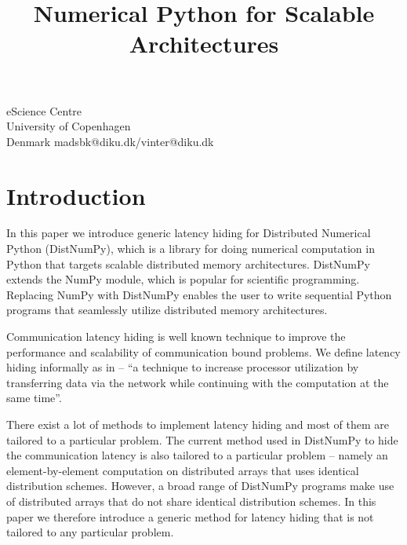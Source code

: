 \documentclass[preprint]{../PGAS10/sigplanconf}
\begin{document}


\title{Numerical Python for Scalable Architectures}

           {eScience Centre\\ University of Copenhagen\\ Denmark}
           {madsbk@diku.dk/vinter@diku.dk}

\maketitle

\begin{abstract}

\end{abstract}

\section{Introduction}
In this paper we introduce generic latency hiding for Distributed Numerical Python (DistNumPy)\cite{distnumpy09}, which is a library for doing numerical computation in Python that targets scalable distributed memory architectures. DistNumPy extends the NumPy module\cite{numpy}, which is popular for scientific programming. Replacing NumPy with DistNumPy enables the user to write sequential Python programs that seamlessly utilize distributed memory architectures.

Communication latency hiding is well known technique to improve the performance and scalability of communication bound problems. We define latency hiding informally as in \cite{Strumpen94latencyhiding} -- ``a technique to increase processor utilization by transferring data via the network while continuing with the computation at the same time''.

There exist a lot of methods to implement latency hiding and most of them are tailored to a particular problem. The current method used in DistNumPy to hide the communication latency is also tailored to a particular problem -- namely an element-by-element computation on distributed arrays that uses identical distribution schemes. However, a broad range of DistNumPy programs make use of distributed arrays that do not share identical distribution schemes. In this paper we therefore introduce a generic method for latency hiding that is not tailored to any particular problem.
\end{document}
